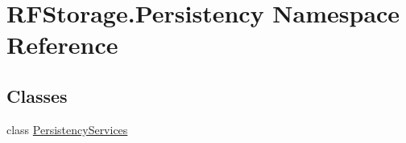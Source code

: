 \hypertarget{namespace_r_f_storage_1_1_persistency}{}\section{R\+F\+Storage.\+Persistency Namespace Reference}
\label{namespace_r_f_storage_1_1_persistency}
\subsection*{Classes}
\begin{DoxyCompactItemize}
\item 
class \mbox{\hyperlink{class_r_f_storage_1_1_persistency_1_1_persistency_services}{Persistency\+Services}}
\end{DoxyCompactItemize}
